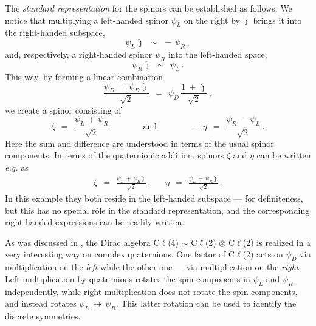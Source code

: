 \documentclass[epsfig,12pt]{article}
\newcommand{\jj}{\hat\jmath}
\begin{document}
	The \emph{standard representation} for the spinors can be established as follows.
	We notice that multiplying a left-handed spinor $ \psi_L $ on the right by $ \jj $
	brings it into the right-handed subspace,
\begin{equation}
	\psi_L\,\jj	~~\sim~~	-\,\psi_R\,,
\end{equation}
	and, respectively, a right-handed spinor $ \psi_R $ into the left-handed space,
\begin{equation}
	\psi_R\,\jj	~~\sim~~	\psi_L\,.
\end{equation}
	This way, by forming a linear combination
\begin{equation}
	\frac{\psi_D  ~+~  \psi_D\,\jj}{\sqrt 2}	~~=~~	\psi_D\, \frac{ 1 ~+~ \jj }{\sqrt 2}\,,
\end{equation}
	we create a spinor consisting of
\begin{equation}
	\zeta	~~=~~	\frac{\psi_L \,+\, \psi_R}{\sqrt 2}
	\qquad\qquad\text{and}\qquad\qquad
	-\,\eta	~~=~~	\frac{\psi_R \,-\, \psi_L}{\sqrt 2}\,.
\end{equation}
	Here the sum and difference are understood in terms of the usual spinor components.
	In terms of the quaternionic addition, spinors $ \zeta $ and $ \eta $
	can be written \emph{e.g.} as
\begin{align}
	\zeta	~~=~~	\frac{\psi_L \,+\, \psi_R \jj}{\sqrt{2}}\,,
	&&
	\eta	~~=~~	\frac{\psi_L \,-\, \psi_R \jj}{\sqrt{2}}\,.
\end{align}
	In this example they both reside in the left-handed subspace --- for definiteness,
	but this has no special r\^ole in the standard representation,
	and the corresponding right-handed expressions can be readily written.

	As was discussed in \cite{thesis}, the Dirac algebra
	C$\ell$(4) $ \sim $  C$\ell$(2) $ \otimes $ C$\ell$(2)
	is realized in a very interesting way on complex quaternions.
	One factor of C$\ell$(2) acts on $ \psi_D $ via multiplication on the \emph{left}
	while the other one --- via multiplication on the \emph{right}.
	Left multiplication by quaternions rotates the spin components in 
	$ \psi_L $ and $ \psi_R $ independently, while right multiplication
	does not rotate the spin components, and instead rotates 
	$ \psi_L \,\leftrightarrow\, \psi_R $.
	This latter rotation can be used to identify the discrete symmetries.


\end{document}
